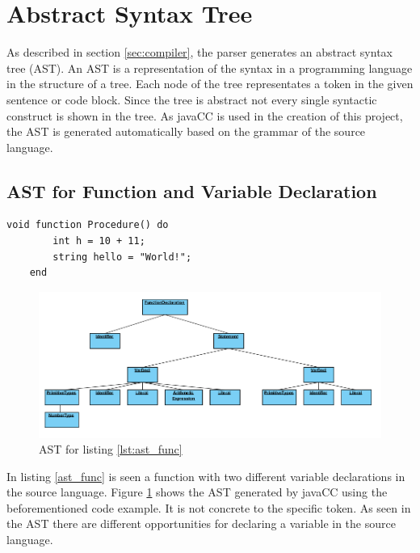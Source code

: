 \section{Abstract Syntax Tree}
\label{sec:AST}
As described in section \ref{sec:compiler}, the parser generates an abstract syntax tree (AST). An AST is a representation of the syntax in a programming language in the structure of a tree. Each node of the tree representates a token in the given sentence or code block. Since the tree is abstract not every single syntactic construct is shown in the tree. As javaCC is used in the creation of this project, the AST is generated automatically based on the grammar of the source language.

\subsection{AST for Function and Variable Declaration}
\begin{lstlisting}[caption=Function with variable declaration, label=lst:ast_func]
	void function Procedure() do
		int h = 10 + 11;
		string hello = "World!";
	end
\end{lstlisting}
\begin{figure}[H]
	\centering
		\includegraphics[width=\textwidth]{billeder/function_AST.png}
		\caption{AST for listing \ref{lst:ast_func}}
		\label{fig:ast_func}
\end{figure}
In listing \ref{ast_func} is seen a function with two different variable declarations in the source language. Figure \ref{fig:ast_func} shows the AST generated by javaCC using the beforementioned code example. It is not concrete to the specific token. As seen in the AST there are different opportunities for declaring a variable in the source language.

